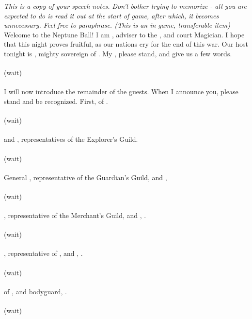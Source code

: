 \documentclass[white]{NeptuneBall}
\begin{document}
\name{\wSpeech{}}

\emph{This is a copy of your speech notes. Don't bother trying to memorize - all you are expected to do is read it out at the start of game, after which, it becomes unnecessary. Feel free to paraphrase. (This is an in game, transferable item)}\\

Welcome to the Neptune Ball! I am \cManta{}, adviser to the \cKing{\King}, and court Magician. I hope that this night proves fruitful, as our nations cry for the end of this war. Our host tonight is \cKing{\King} \cKing{}, mighty sovereign of \pAtlantis{}. My \cKing{\King}, please stand, and give us a few words.
\\ \\(wait)\\ \\
I will now introduce the remainder of the guests. When I announce you, please stand and be recognized. First, \cPrincess{\Prince} \cPrincess{} of \pAtlantis{}.
\\ \\(wait)\\ \\
\cPlant{\Prince} \cPlant{} and \cPriest{}, representatives of the Explorer's Guild.
\\ \\(wait)\\ \\
General \cGeneral{}, representative of the Guardian's Guild, and \cGeneral{\their} \cQueen{\spouse}, \cQueen{}
\\ \\(wait)\\ \\
\cSlave{}, representative of the Merchant's Guild, and \cSlave{\their} \cWitch{\spouse}, \cWitch{\MYname}.
\\ \\(wait)\\ \\
\cAriel{\King} \cAriel{}, representative of \pAmerica{}, and \cAriel{\their} \cWillow{\offspring}, \cWillow{}.
\\ \\(wait)\\ \\
\cPrince{\Prince} \cPrince{} of \pPacifica{}, and \cPrince{\their} bodyguard, \cBodyguard{}.
\\ \\(wait)\\ \\
\end{document}
